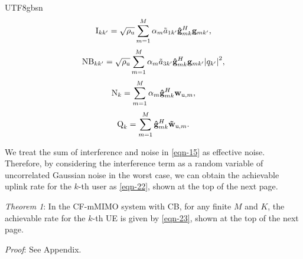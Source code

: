 \documentclass[lettersize,journal]{IEEEtran}
\begin{document}
\begin{CJK}{UTF8}{gbsn}
\begin{equation}\label{eqn-18}{\text{I}_{kk'}} = \sqrt {{\rho _\text{u}}}\sum_{m = 1}^M {\alpha _m}{\tilde{a}_{1k'}}{{\bf{\hat g}}^H_{mk}}{{\bf{g}}_{mk'}},\end{equation}
\begin{equation}\label{eqn-19}{\text{NB}_{kk'}} = \sqrt {{\rho _\text{u}}} \sum_{m = 1}^M {\alpha _m}{\tilde{a}_{3k'}}{{\bf{\hat g}}^H_{mk}}{{\bf{g}}_{mk'}}{\left| {{q_{k'}}} \right|^2},\end{equation}
\begin{equation}\label{eqn-20}{\text{N}_k} = \sum_{m = 1}^M {\alpha _m}{\bf{\hat g}}_{mk}^H{{\bf{w}}_{\text{u},m}},\end{equation}
\begin{equation}\label{eqn-21}{\text{Q}_k} = \sum_{m = 1}^M {{\bf{\hat g}}^H_{mk}}{{\bf{\tilde w}}_{\text{u},m}}.\end{equation}

We treat the sum of interference and noise in \eqref{eqn-15} as effective noise. Therefore, by considering the interference term as a random variable of uncorrelated Gaussian noise in the worst case, we can obtain the achievable uplink rate for the $k$-th user as \eqref{eqn-22}, shown at the top of the next page.

\textit{Theorem 1}: In the CF-mMIMO system with CB, for any finite $M$ and $K$, the achievable rate for the $k$-th UE is given by  \eqref{eqn-23}, shown at the top of the next page.

\textit{Proof}: See Appendix.


\end{CJK}
\end{document}
